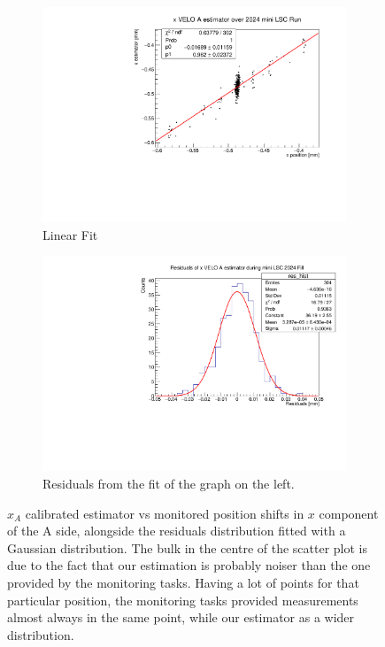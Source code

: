 \begin{figure}
    \centering
    \begin{subfigure}{0.48\textwidth}
    \includegraphics[width=\linewidth]{figures/xVeloA_fit_comparison.pdf}
    \caption{Linear Fit}\label{fig:xAfit_comparison}
    \end{subfigure}
    \begin{subfigure}{0.48\textwidth}
    \includegraphics[width=\linewidth]{figures/xVeloA_res_compariosn.pdf}
    \caption{Residuals from the fit of the graph on the left. }\label{fig:xAres_comparison}
    \end{subfigure}
    \caption{$\hat{x}_{A}$ calibrated estimator vs monitored position shifts in $x$ component of the A side, alongside the residuals distribution fitted with a Gaussian distribution. The bulk in the centre of the scatter plot is due to the fact that our estimation is probably noiser than the one provided by the monitoring tasks. Having a lot of points for that particular position, the monitoring tasks provided measurements almost always in the same point, while our estimator as a wider distribution.}
    \label{fig:xA_comaprison}
\end{figure}
